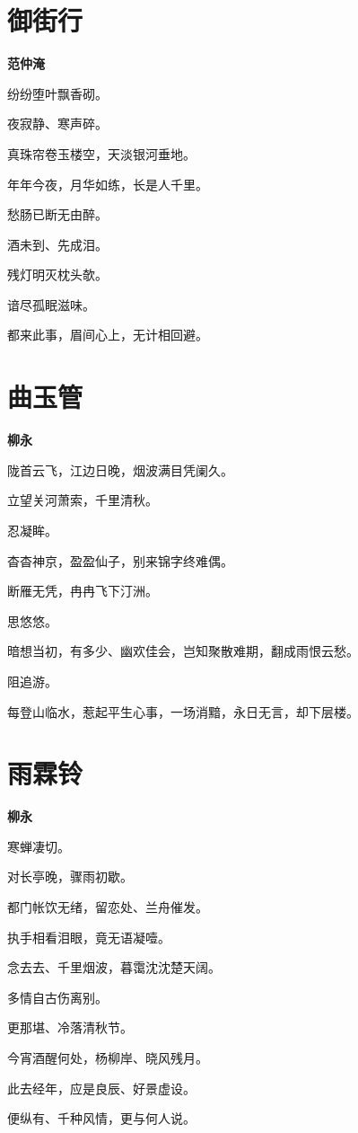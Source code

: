 \documentclass[12pt,a4paper]{ctexbook}
\begin{document}
\section{御街行}
\textbf{范仲淹}\par\vspace{0.5em}
纷纷堕叶飘香砌。\par
夜寂静、寒声碎。\par
真珠帘卷玉楼空，天淡银河垂地。\par
年年今夜，月华如练，长是人千里。\par
愁肠已断无由醉。\par
酒未到、先成泪。\par
残灯明灭枕头欹。\par
谙尽孤眠滋味。\par
都来此事，眉间心上，无计相回避。\par

\section{曲玉管}
\textbf{柳永}\par\vspace{0.5em}
陇首云飞，江边日晚，烟波满目凭阑久。\par
立望关河萧索，千里清秋。\par
忍凝眸。\par
杳杳神京，盈盈仙子，别来锦字终难偶。\par
断雁无凭，冉冉飞下汀洲。\par
思悠悠。\par
暗想当初，有多少、幽欢佳会，岂知聚散难期，翻成雨恨云愁。\par
阻追游。\par
每登山临水，惹起平生心事，一场消黯，永日无言，却下层楼。\par

\section{雨霖铃}
\textbf{柳永}\par\vspace{0.5em}
寒蝉凄切。\par
对长亭晚，骤雨初歇。\par
都门帐饮无绪，留恋处、兰舟催发。\par
执手相看泪眼，竟无语凝噎。\par
念去去、千里烟波，暮霭沈沈楚天阔。\par
多情自古伤离别。\par
更那堪、冷落清秋节。\par
今宵酒醒何处，杨柳岸、晓风残月。\par
此去经年，应是良辰、好景虚设。\par
便纵有、千种风情，更与何人说。\par
\end{document}
